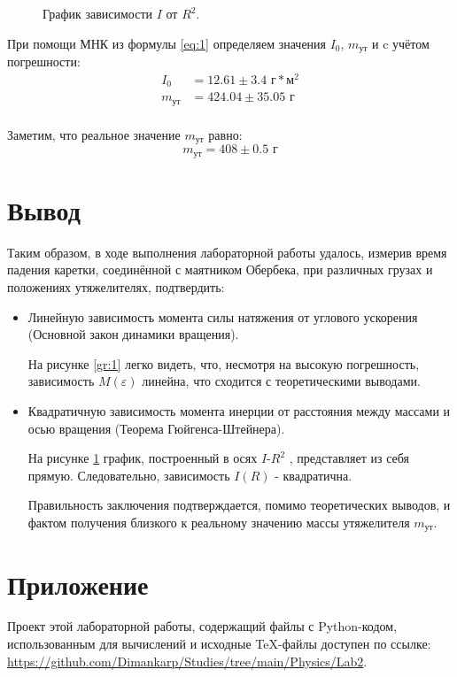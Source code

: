\documentclass[12pt, a4paper]{article}
\begin{document}
\begin{figure}[H]
\caption{График зависимости $I$ от $R^2$.}
\label{gr:2}
\end{figure}

При помощи МНК из формулы \eqref{eq:1} определяем значения $I_0$, $m_{\text{ут}}$ и c учётом погрешности:
\begin{equation*}
\begin{aligned}
 I_0 &= 12.61 \pm 3.4 \text{ г}*\text{м}^2 \\
 m_{\text{ут}} &= 424.04 \pm 35.05 \text{ г} \\
  \end{aligned}
\end{equation*}

Заметим, что реальное значение $ m_{\text{ут}}$ равно:
\begin{equation*}
 m_{\text{ут}} = 408 \pm 0.5 \text{ г}
\end{equation*}

\section{Вывод}
Таким образом, в ходе выполнения лабораторной работы удалось, измерив время падения каретки, соединённой с маятником Обербека, при различных грузах и положениях утяжелителях, подтвердить:
\begin{itemize}
\item[1.] Линейную зависимость момента силы натяжения от углового ускорения (Основной закон динамики вращения). 

На рисунке \ref{gr:1} легко видеть, что, несмотря на высокую погрешность, зависимость $M(\varepsilon)$ линейна, что сходится с теоретическими выводами.

\item[2.] Квадратичную зависимость момента инерции от расстояния между массами и осью вращения (Теорема Гюйгенса-Штейнера). 

На рисунке \ref{gr:2} график, построенный в осях $I$-$R^2$ , представляет из себя прямую. Следовательно, зависимость $I(R)$ - квадратична.

Правильность заключения подтверждается, помимо теоретических выводов, и фактом получения близкого к реальному значению массы утяжелителя $m_{\text{ут}}$.


\end{itemize}


\section{Приложение}
Проект этой лабораторной работы, содержащий файлы с Python-кодом, использованным для вычислений и исходные TeX-файлы доступен по ссылке: \url{https://github.com/Dimankarp/Studies/tree/main/Physics/Lab2}.
\end{document}
